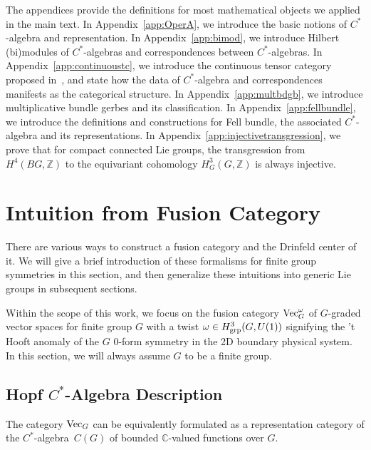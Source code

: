 \documentclass[a4paper,11pt]{article}
\def\bbC{\mathbb{C}}
\def\bbZ{\mathbb{Z}}
\def\calg{$C^*$-algebra\ }
\def\vecg{{\rm Vec}_G}
\begin{document}
The appendices provide the definitions for most mathematical objects we applied in the main text. In Appendix~\ref{app:OperA}, we introduce the basic notions of $C^*$-algebra and representation. In Appendix~\ref{app:bimod}, we introduce Hilbert (bi)modules of $C^*$-algebras and correspondences between $C^*$-algebras. In Appendix~\ref{app:continuoustc}, we introduce the continuous tensor category proposed in~\cite{Marin-Salvador:2025stc}, and state how the data of $C^*$-algebra and correspondences manifests as the categorical structure. In Appendix~\ref{app:multbdgb}, we introduce multiplicative bundle gerbes and its classification. In Appendix~\ref{app:fellbundle}, we introduce the definitions and constructions for Fell bundle, the associated $C^*$-algebra and its representations. In Appendix~\ref{app:injectivetransgression}, we prove that for compact connected Lie groups, the transgression from $H^4(BG,\bbZ)$ to the equivariant cohomology $H^3_G(G,\bbZ)$ is always injective.


\section{Intuition from Fusion Category}\label{sec:fusioncat}
There are various ways to construct a fusion category and the Drinfeld center of it. We will give a brief introduction of these formalisms for finite group symmetries in this section, and then generalize these intuitions into generic Lie groups in subsequent sections. 

Within the scope of this work, we focus on the fusion category ${\rm Vec}^\omega_G$ of $G$-graded vector spaces for finite group $G$ with a twist $\omega\in H^3_{\rm grp}(G,U(1))$ signifying the 't Hooft anomaly of the $G$ 0-form symmetry in the 2D boundary physical system. In this section, we will always assume $G$ to be a finite group.

\subsection{Hopf $C^*$-Algebra Description}
The category $\vecg$ can be equivalently formulated as a representation category of the \calg $C(G)$ of bounded $\bbC$-valued functions over $G$. 
\end{document}
